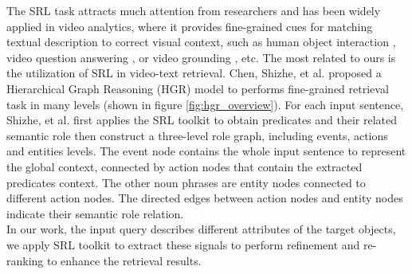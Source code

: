 The SRL task attracts much attention from researchers and has been widely applied in video analytics, where it provides fine-grained cues for matching textual description to correct visual context, such as human object interaction \cite{gupta2015visual}, video question answering \cite{sadhu2021video}, or video grounding \cite{sadhu2020video}, etc. The most related to ours is the utilization of SRL in video-text retrieval. Chen, Shizhe, et al. \cite{chen2020fine} proposed a Hierarchical Graph Reasoning (HGR) model to performs fine-grained retrieval task in many levels (shown in figure \ref{fig:hgr_overview}).
For each input sentence, Shizhe, et al. \cite{chen2020fine} first applies the SRL toolkit \cite{shi2019simple} to obtain predicates and their related semantic role then construct a three-level role graph, including events, actions and entities levels. 
The event node contains the whole input sentence to represent the global context, connected by action nodes that contain the extracted predicates context. The other noun phrases are entity nodes connected to different action nodes. The directed edges between action nodes and entity nodes indicate their semantic role relation.\\
In our work, the input query describes different attributes of the target objects, we apply SRL toolkit\cite{shi2019simple} to extract these signals to perform refinement and re-ranking to enhance the retrieval results.


